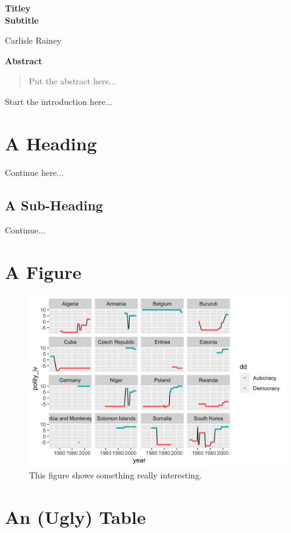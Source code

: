 \documentclass[12pt]{article}
\begin{document}
\begin{center}
{\LARGE \textbf{Titley}}\\\vspace{2mm}
{ \textbf{Subtitle}}

\vspace{5mm}

Carlisle Rainey
\end{center}

\vspace{5mm}

{\centerline{\textbf{Abstract}}}
\begin{quote}
\noindent Put the abstract here...
\end{quote}

\thispagestyle{empty}

\doublespace

Start the introduction here...

\section*{A Heading}

Continue here...

\subsection*{A Sub-Heading}

Continue...

\section*{A Figure}

\begin{figure}[h!]
\begin{center}
\includegraphics[width = \textwidth]{fig/plot1.png}
\caption{This figure shows something really interesting.}\label{fig:something-interesting}
\end{center}
\end{figure}


\section*{An (Ugly) Table}


\end{document}
